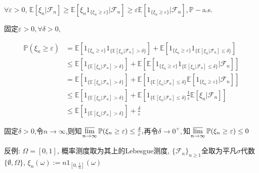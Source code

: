 \begin{enumerate}
    \begin{proofc}[解答]
    $\forall \varepsilon>0$, $\mathbb{E}[\xi_n|\mathscr{F}_n]\geq \mathbb{E}[\xi_n1_{\{\xi_n\geq \varepsilon\}}|\mathscr{F}_n]\geq \varepsilon \mathbb{E}[1_{\{\xi_n\geq \varepsilon\}}|\mathscr{F}_n], \mathbb{P}-$a.s.

    固定$\varepsilon>0,\forall \delta>0,$
    
    $$
    \begin{aligned}
    \mathbb{P}(\xi_n\geq \varepsilon) &= \mathbb{E}[1_{\{\xi_n\geq \varepsilon\}}1_{\{ \mathbb{E}[\xi_n|\mathscr{F}_n] > \delta \}}  ]+ \mathbb{E}[1_{\{\xi_n\geq \varepsilon\}}1_{\{ \mathbb{E}[\xi_n|\mathscr{F}_n] \leq \delta \}} ] \\
    &\leq \mathbb{E}[1_{\{ \mathbb{E}[\xi_n|\mathscr{F}_n] > \delta \}} ]+ \mathbb{E}[   \mathbb{E}[1_{\{\xi_n\geq \varepsilon\}}1_{\{ \mathbb{E}[\xi_n|\mathscr{F}_n]\leq \delta \}}|\mathscr{F}_n] ]\\
    &= \mathbb{E}[1_{\{ \mathbb{E}[\xi_n|\mathscr{F}_n] > \delta \}} ]+ \mathbb{E}[ 1_{\{ \mathbb{E}[\xi_n|\mathscr{F}_n]\leq \delta \}}      \mathbb{E}[1_{\{\xi_{n}\geq \varepsilon\}}|\mathscr{F}_n] ]\\
    &\leq \mathbb{E}[1_{\{ \mathbb{E}[\xi_n|\mathscr{F}_n] > \delta \}} ]+  \mathbb{E}[ 1_{\{ \mathbb{E}[\xi_n|\mathscr{F}_n]\leq \delta \}}     \frac{1}{\varepsilon}\mathbb{E}[\xi_n|\mathscr{F}_n]     ]\\
    &\leq \mathbb{E}[1_{\{ \mathbb{E}[\xi_n|\mathscr{F}_n] > \delta \}} ]+\frac{\delta}{\varepsilon}
    \end{aligned}
    $$


    固定$\delta>0$,令$n\to \infty$,则知$\varlimsup\limits_{n\to \infty}\mathbb{P}(\xi_n\geq \varepsilon)\leq \frac{\delta}{\varepsilon},$再令$\delta\to 0^+,$知$\varlimsup\limits_{n\to \infty}\mathbb{P}(\xi_n\geq \varepsilon)\leq 0$

    反例: $\Omega=[0,1]$, 概率测度取为其上的Lebesgue测度, $\{\mathscr{F}_n\}_{n \geq 1}$全取为平凡$\sigma$代数$\{\emptyset,\Omega\}$, $\xi_n(\omega):=n1_{[0,\frac{1}{n}]}(\omega)$
    \end{proofc}

\end{enumerate}